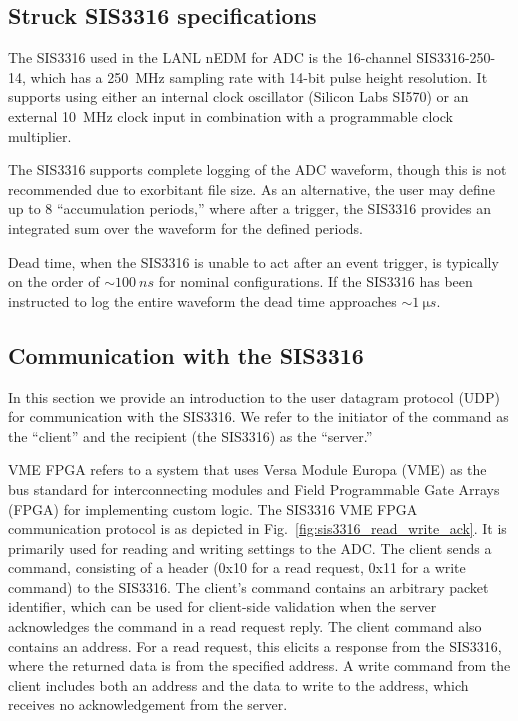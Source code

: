 
\subsection{Struck SIS3316 specifications}\label{sec:sis3316_specs}


The SIS3316 used in the LANL nEDM for ADC is the 16-channel SIS3316-250-14, which has a \qty{250}{MHz} sampling rate with 14-bit pulse height resolution. It supports using either an internal clock oscillator (Silicon Labs SI570) or an external \qty{10}{MHz} clock input in combination with a programmable clock multiplier.

The SIS3316 supports complete logging of the ADC waveform, though this is not recommended due to exorbitant file size. As an alternative, the user may define up to 8 ``accumulation periods,'' where after a trigger, the SIS3316 provides an integrated sum over the waveform for the defined periods.

Dead time, when the SIS3316 is unable to act after an event trigger, is typically on the order of $\sim\qty{100}{ns}$ for nominal configurations. If the SIS3316 has been instructed to log the entire waveform the dead time approaches $\sim\qty{1}{\micro s}$.



\subsection{Communication with the SIS3316}\label{sec:sis3316_udp_protocol}


In this section we provide an introduction to the user datagram protocol (UDP) for communication with the SIS3316. We refer to the initiator of the command as the ``client'' and the recipient (the SIS3316) as the ``server.''

VME FPGA refers to a system that uses Versa Module Europa (VME) as the bus standard for interconnecting modules and Field Programmable Gate Arrays (FPGA) for implementing custom logic. The SIS3316 VME FPGA communication protocol is as depicted in Fig.~\ref{fig:sis3316_read_write_ack}. It is primarily used for reading and writing settings to the ADC. The client sends a command, consisting of a header (0x10 for a read request, 0x11 for a write command) to the SIS3316. The client's command contains an arbitrary packet identifier, which can be used for client-side validation when the server acknowledges the command in a read request reply. The client command also contains an address. For a read request, this elicits a response from the SIS3316, where the returned data is from the specified address. A write command from the client includes both an address and the data to write to the address, which receives no acknowledgement from the server.

